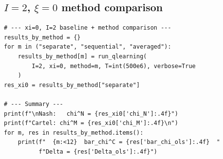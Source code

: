 \subsection{$I=2$, $\xi=0$ method comparison}

\begin{lstlisting}[style=pythonstyle]
# --- xi=0, I=2 baseline + method comparison ---
results_by_method = {}
for m in ("separate", "sequential", "averaged"):
    results_by_method[m] = run_qlearning(
        I=2, xi=0, method=m, T=int(500e6), verbose=True
    )
res_xi0 = results_by_method["separate"]

# --- Summary ---
print(f"\nNash:   chi^N = {res_xi0['chi_N']:.4f}")
print(f"Cartel: chi^M = {res_xi0['chi_M']:.4f}\n")
for m, res in results_by_method.items():
    print(f"  {m:<12}  bar_chi^C = {res['bar_chi_ols']:.4f}  "
          f"Delta = {res['Delta_ols']:.4f}")
\end{lstlisting}

